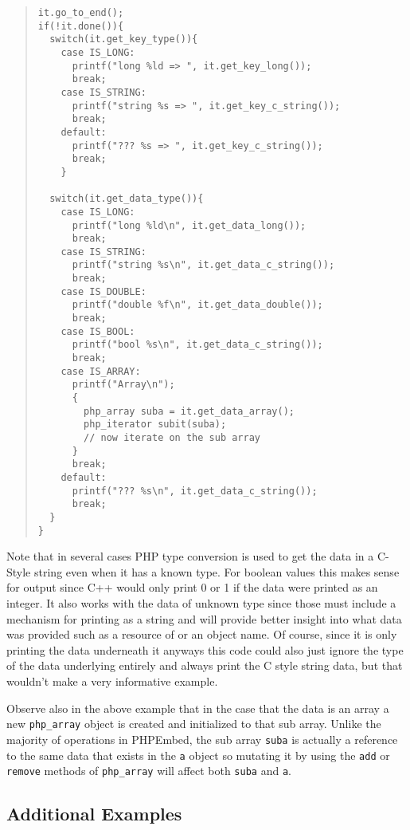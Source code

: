 \documentclass[11pt,titlepage]{article}
\begin{document}
\begin{quote}
\begin{verbatim}
it.go_to_end();
if(!it.done()){
  switch(it.get_key_type()){
    case IS_LONG:
      printf("long %ld => ", it.get_key_long());
      break;
    case IS_STRING:
      printf("string %s => ", it.get_key_c_string());
      break;
    default:
      printf("??? %s => ", it.get_key_c_string());
      break;
    }

  switch(it.get_data_type()){
    case IS_LONG:
      printf("long %ld\n", it.get_data_long());
      break;
    case IS_STRING:
      printf("string %s\n", it.get_data_c_string());
      break;
    case IS_DOUBLE:
      printf("double %f\n", it.get_data_double());
      break;
    case IS_BOOL:
      printf("bool %s\n", it.get_data_c_string());
      break;
    case IS_ARRAY:
      printf("Array\n");
      {
        php_array suba = it.get_data_array();
        php_iterator subit(suba);
        // now iterate on the sub array
      }
      break;
    default:
      printf("??? %s\n", it.get_data_c_string());
      break;
  }
}
\end{verbatim}
\end{quote}

Note that in several cases PHP type conversion is used to get the data in a C-Style string even when it has a known type. For boolean values this makes sense for output since C++ would only print 0 or 1 if the data were printed as an integer. It also works with the data of unknown type since those must include a mechanism for printing as a string and will provide better insight into what data was provided such as a resource of or an object name. Of course, since it is only printing the data underneath it anyways this code could also just ignore the type of the data underlying entirely and always print the C style string data, but that wouldn't make a very informative example.

Observe also in the above example that in the case that the data is an array a new \verb|php_array| object is created and initialized to that sub array. Unlike the majority of operations in PHPEmbed, the sub array \verb|suba| is actually a reference to the same data that exists in the \verb|a| object so mutating it by using the \verb|add| or \verb|remove| methods of \verb|php_array| will affect both \verb|suba| and \verb|a|. 

\subsection{Additional Examples}
\end{document}
